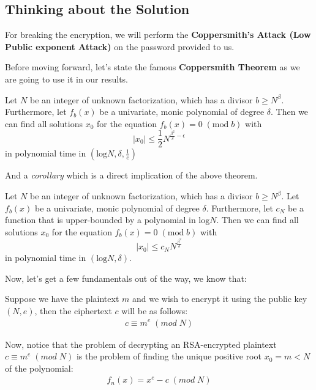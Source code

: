 \documentclass[10pt,twoside]{article}
\begin{document}
\subsection{Thinking about the Solution} \label{sec:1}

For breaking the encryption, we will perform the \textbf{Coppersmith's Attack (Low Public exponent Attack)} on the password provided to us. \newline

Before moving forward, let's state the famous \textbf{Coppersmith Theorem} as we are going to use it in our results.

\begin{theorem}
  Let $N$ be an integer of unknown factorization, which has a divisor $b \geq N^{\beta}$. Furthermore, let $f_b(x)$ be a univariate, monic polynomial of degree $\delta$. Then we can find all solutions $x_0$ for the equation $f_b(x) = 0 \; (\text{mod} \; b)$ with
$$|x_0| \leq \frac{1}{2}N^{\frac{\beta^2}{\delta}-\epsilon}$$
  in polynomial time in $\left(\text{log}N, \delta, \frac{1}{e}\right)$
\end{theorem}

And a \textit{corollary} which is a direct implication of the above theorem.

\begin{theorem} \label{theorem:2}
  Let $N$ be an integer of unknown factorization, which has a divisor $b \geq N^{\beta}$. Let $f_b(x)$ be a univariate, monic polynomial of degree $\delta$. Furthermore, let $c_N$ be a function that is upper-bounded by a polynomial in $\text{log}N$. Then we can find all solutions $x_0$ for the equation $f_b(x) = 0 \; (\text{mod} \; b)$ with
  $$|x_0| \leq c_N N^{\frac{\beta^2}{\delta}}$$
  in polynomial time in $(\text{log}N, \delta)$.
\end{theorem}

Now, let's get a few fundamentals out of the way, we know that: \newline

Suppose we have the plaintext $m$ and we wish to encrypt it using the public key $(N,e)$, then the ciphertext $c$ will be as follows:
\begin{align}
  c \equiv m^e \; (mod \; N) \label{eq:2}
\end{align}

Now, notice that the problem of decrypting an RSA-encrypted plaintext $c \equiv m^e \; (mod \; N)$ is the problem of finding the unique positive root $x_0 = m < N$ of the polynomial:
\begin{align}
  f_n(x) = x^e - c \; (mod \; N) \label{eq:3}
\end{align}
\end{document}
